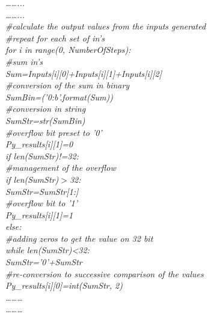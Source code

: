 \textit{……...\\
……...\\
\#calculate the output values from the inputs generated\\
\#repeat for each set of in's\\
for i in range(0, NumberOfSteps):\\  
\hspace*{1cm}\#sum in's\\
\hspace*{1cm}Sum=Inputs[i][0]+Inputs[i][1]+Inputs[i][2]\\
\hspace*{1cm}\#conversion of the sum in binary\\
\hspace*{1cm}SumBin=('{0:b}'.format(Sum))\\
\hspace*{1cm}\#conversion in string \\
\hspace*{1cm}SumStr=str(SumBin)\\
\hspace*{1cm}\#overflow bit preset to '0'\\
\hspace*{1cm}Py\_results[i][1]=0 \\
\hspace*{1cm}if len(SumStr)!=32:\\
\hspace*{2cm}\#management of the overflow\\
\hspace*{2cm}if len(SumStr)$>$32:    \\
\hspace*{3cm}SumStr=SumStr[1:]\\
\hspace*{3cm}\#overflow bit to '1'\\
\hspace*{3cm}Py\_results[i][1]=1\\
\hspace*{2cm}else:\\
\hspace*{3cm}\#adding zeros to get the value on 32 bit\\
\hspace*{3cm}while len(SumStr)<32:  \\
\hspace*{3cm}SumStr='0'+SumStr\\
\hspace*{1cm}\#re-conversion to successive comparison of the values\\
\hspace*{1cm}Py\_results[i][0]=int(SumStr, 2)\\  
………\\
………}\\
